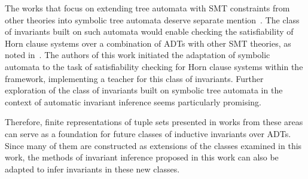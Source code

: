 The works that focus on extending tree automata with SMT constraints from other theories into symbolic tree automata deserve separate mention~\cite{VEANES2015418,10.1145/2933575.2933578}. The class of invariants built on such automata would enable checking the satisfiability of Horn clause systems over a combination of ADTs with other SMT theories, as noted in~\cite{10.1007/978-3-031-13188-2_13}. The authors of this work initiated the adaptation of symbolic automata to the task of satisfiability checking for Horn clause systems within the \ice{} framework, implementing a teacher for this class of invariants. Further exploration of the class of invariants built on symbolic tree automata in the context of automatic invariant inference seems particularly promising.

Therefore, finite representations of tuple sets presented in works from these areas can serve as a foundation for future classes of inductive invariants over ADTs. Since many of them are constructed as extensions of the classes examined in this work, the methods of invariant inference proposed in this work can also be adapted to infer invariants in these new classes.

